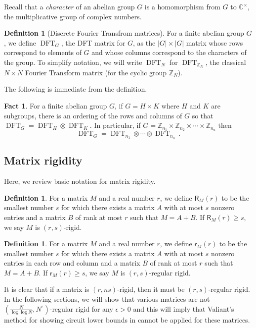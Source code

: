 \documentclass[11pt]{article}
\numberwithin{equation}{section}
\theoremstyle{definition}
\theoremstyle{plain}
\newcommand{\C}{\mathbb C}
\newcommand{\Z}{\mathbb Z}
\theoremstyle{definition}
\newtheorem{define}[theorem]{Definition}
\newtheorem{fact.}[theorem]{Fact}
\renewcommand\Z{{\mathbb{Z}}}
\renewcommand\C{{\mathbb{C}}}
\DeclareMathOperator{\DFT}{DFT}
\begin{document}
%
%
%
Recall that a \emph{character} of an abelian group $G$ is a
homomorphism from $G$ to $\C^{\times}$, the multiplicative group
of complex numbers.   %
\begin{define}[Discrete Fourier Transfrom matrices] %
For a finite abelian group $G$, we
%
define $\DFT_G$, the DFT matrix for $G$, %
as the $|G| \times |G|$ matrix whose rows correspond to elements of $G$ and
whose columns correspond to the characters of the group. %
To simplify notation, we will write 
$\DFT_N$ for %
$\DFT_{\Z_N}$, the classical $N\times N$ Fourier Transform matrix  %
(for the cyclic group $\Z_N$).  %
%
\end{define}
The following is immediate from the definition. %
\begin{fact.}\label{fact:dftproduct}
%
For a finite abelian group $G$, if $G = H \times K$ where $H$ and $K$ are
%
subgroups,   %
there is an ordering of the rows and columns of $G$ so that $\DFT_G = \DFT_H \otimes \DFT_K$.  In particular, if $G = \Z_{n_1} \times \Z_{n_2} \times \cdots \times \Z_{n_a}$ then 
$$\DFT_G = \DFT_{n_1} \otimes \cdots \otimes \DFT_{n_a}\,.$$
\end{fact.}
%
%
%
%
%
%
%
%
%
%
%
%
%
%


%
\subsection{Matrix rigidity}    %
Here, we review basic notation for matrix rigidity.
\begin{define}
For a matrix $M$ and a real number $r$, we define $\textsf{R}_M(r)$ to be the smallest number $s$ for which there exists a matrix $A$ with at most $s$ nonzero entries and a matrix $B$ of rank at most $r$ such that $M = A+B$.  If $\textsf{R}_M(r) \geq s$, we say $M$ is $(r,s)$-rigid.
\end{define}


\begin{define}
For a matrix $M$ and a real number $r$, we define $\textsf{r}_M(r)$ to be the smallest number $s$ for which there exists a matrix $A$ with at most $s$ nonzero entries in each row and column and a matrix $B$ of rank at most $r$ such that $M = A+B$.  If $\textsf{r}_M(r) \geq s$, we say $M$ is $(r,s)$-regular rigid.
\end{define}
It is clear that if a matrix is $(r,ns)$-rigid, then it must be $(r,s)$-regular rigid.  In
%
the following  %
sections, we will show that various matrices are not $(\frac{N}{\log \log N}, N^{\epsilon})$-regular rigid for any $\epsilon >0$ and this will imply that Valiant's method for showing circuit lower bounds in \cite{rigidity} cannot be applied for these matrices.
\end{document}
